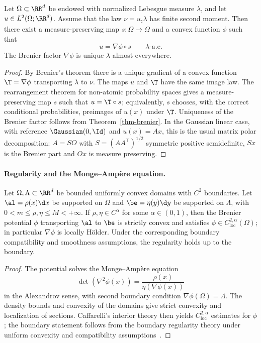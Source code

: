 \begin{prop}\label{prop-polar-factorization}
	Let $\Omega\subset\RR^d$ be endowed with normalized Lebesgue measure $\lambda$, and let $u\in L^2(\Omega;\RR^d)$. Assume that the law $\nu=u_\sharp\lambda$ has finite second moment. Then there exist a measure-preserving map $s:\Omega\to\Omega$ and a convex function $\phi$ such that
	\[
		u=\nabla\phi\circ s
		\qquad \lambda\text{-a.e.}
	\]
	The Brenier factor $\nabla\phi$ is unique $\lambda$-almost everywhere.
\end{prop}
\begin{proof}
	By Brenier's theorem there is a unique gradient of a convex function $\T=\nabla\phi$ transporting $\lambda$ to $\nu$. The maps $u$ and $\T$ have the same image law. The rearrangement theorem for non-atomic probability spaces gives a measure-preserving map $s$ such that $u=\T\circ s$; equivalently, $s$ chooses, with the correct conditional probabilities, preimages of $u(x)$ under $\T$. Uniqueness of the Brenier factor follows from Theorem~\ref{thm-brenier}. In the Gaussian linear case, with reference $\Gaussian(0,\Id)$ and $u(x)=Ax$, this is the usual matrix polar decomposition: $A=SO$ with $S=(AA^\top)^{1/2}$ symmetric positive semidefinite, $Sx$ is the Brenier part and $Ox$ is measure preserving.
\end{proof}

\paragraph{Regularity and the Monge--Amp\`ere equation.}

\begin{prop}\label{prop-caffarelli-regularity}
	Let $\Omega,\Lambda\subset\RR^d$ be bounded uniformly convex domains with $C^2$ boundaries. Let $\al=\rho(x)\d x$ be supported on $\Omega$ and $\be=\eta(y)\d y$ be supported on $\Lambda$, with $0<m\leq\rho,\eta\leq M<+\infty$. If $\rho,\eta\in C^\alpha$ for some $\alpha\in(0,1)$, then the Brenier potential $\phi$ transporting $\al$ to $\be$ is strictly convex and satisfies $\phi\in C^{2,\alpha}_{\mathrm{loc}}(\Omega)$; in particular $\nabla\phi$ is locally H\"older. Under the corresponding boundary compatibility and smoothness assumptions, the regularity holds up to the boundary.
\end{prop}
\begin{proof}
	The potential solves the Monge--Amp\`ere equation
	\[
		\det(\nabla^2\phi(x))
		=
		\frac{\rho(x)}{\eta(\nabla\phi(x))}
	\]
	in the Alexandrov sense, with second boundary condition $\nabla\phi(\Omega)=\Lambda$. The density bounds and convexity of the domains give strict convexity and localization of sections. Caffarelli's interior theory then yields $C^{2,\alpha}_{\mathrm{loc}}$ estimates for $\phi$; the boundary statement follows from the boundary regularity theory under uniform convexity and compatibility assumptions~\cite{caffarelli2003monge,Villani09}.
\end{proof}


